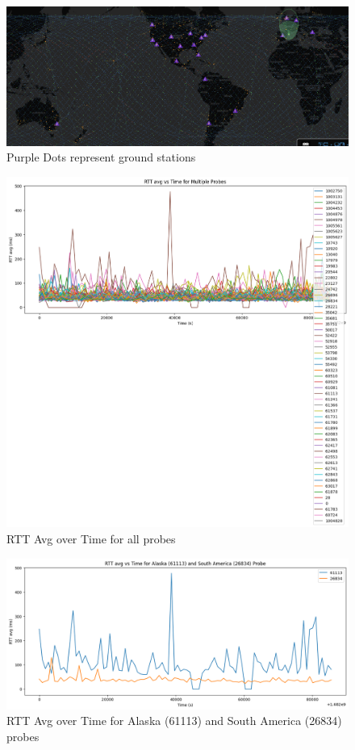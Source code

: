 \documentclass[acmsmall]{acmart}
\begin{document}
\begin{figure}[h]
  \centering
  \includegraphics[width=\linewidth]{ground_stations.png}
  \caption{Purple Dots represent ground stations}
\end{figure}


\begin{figure}[h]
  \centering
  \includegraphics[width=\linewidth]{graph_all.png}
  \caption{RTT Avg over Time for all probes}
  \Description{ }
\end{figure}



\begin{figure}[h]
  \centering
  \includegraphics[width=\linewidth]{graph_alaska_southam.png}
  \caption{RTT Avg over Time for Alaska (61113) and South America (26834) probes}
  \Description{}
\end{figure}
\end{document}
